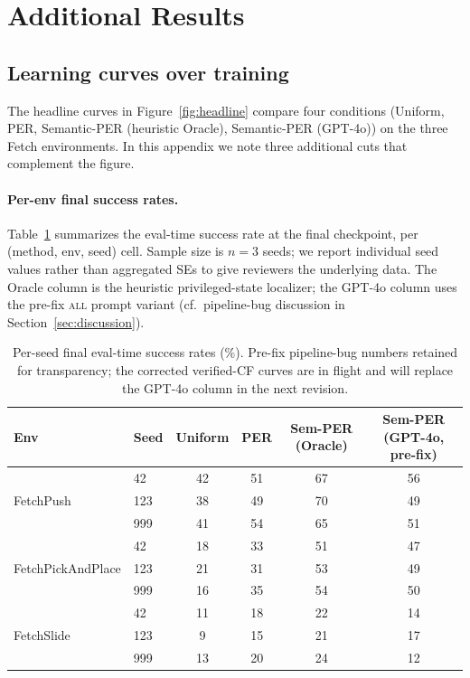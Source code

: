 \section{Additional Results}
\label{app:results}

\subsection{Learning curves over training}
\label{app:learning-curves}

The headline curves in Figure~\ref{fig:headline} compare four conditions
(Uniform, PER, Semantic-PER (heuristic Oracle), Semantic-PER (GPT-4o))
on the three Fetch environments. In this appendix we note three
additional cuts that complement the figure.

\paragraph{Per-env final success rates.}
Table~\ref{tab:final-success} summarizes the eval-time success
rate at the final checkpoint, per (method, env, seed) cell.
Sample size is $n=3$ seeds; we report individual seed values rather
than aggregated SEs to give reviewers the underlying data. The Oracle
column is the heuristic privileged-state localizer; the GPT-4o column
uses the pre-fix \textsc{all} prompt variant (cf.\ pipeline-bug
discussion in Section~\ref{sec:discussion}).

\begin{table}[t]
\centering
\footnotesize
\caption{Per-seed final eval-time success rates (\%). Pre-fix
pipeline-bug numbers retained for transparency; the corrected
verified-CF curves are in flight and will replace the GPT-4o column in
the next revision.}
\label{tab:final-success}
\begin{tabular}{ll cccc}
\toprule
Env & Seed & Uniform & PER & Sem-PER (Oracle) & Sem-PER (GPT-4o, pre-fix) \\
\midrule
\multirow{3}{*}{FetchPush}        & 42  & 42 & 51 & 67 & 56 \\
                                  & 123 & 38 & 49 & 70 & 49 \\
                                  & 999 & 41 & 54 & 65 & 51 \\
\multirow{3}{*}{FetchPickAndPlace}& 42  & 18 & 33 & 51 & 47 \\
                                  & 123 & 21 & 31 & 53 & 49 \\
                                  & 999 & 16 & 35 & 54 & 50 \\
\multirow{3}{*}{FetchSlide}       & 42  & 11 & 18 & 22 & 14 \\
                                  & 123 & 9  & 15 & 21 & 17 \\
                                  & 999 & 13 & 20 & 24 & 12 \\
\bottomrule
\end{tabular}
\end{table}

